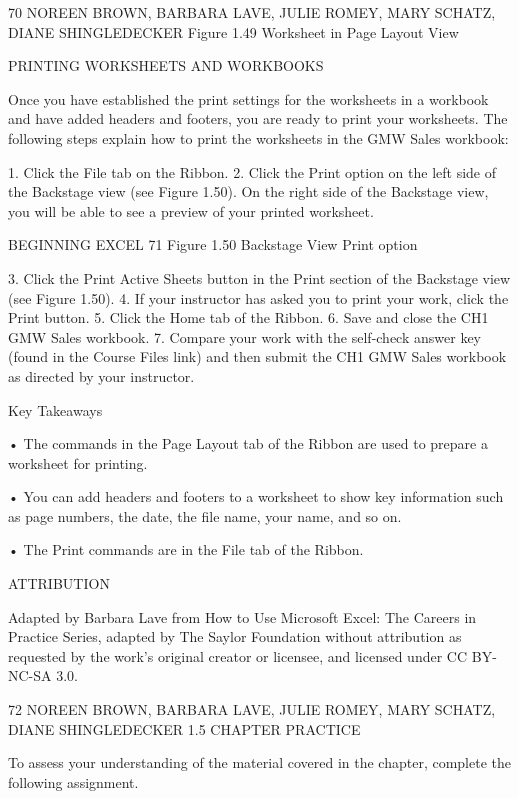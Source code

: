 70 NOREEN BROWN, BARBARA LAVE, JULIE ROMEY, MARY SCHATZ, DIANE SHINGLEDECKER
Figure 1.49 Worksheet in Page Layout View


PRINTING WORKSHEETS AND WORKBOOKS

Once you have established the print settings for the worksheets in a workbook and have added
headers and footers, you are ready to print your worksheets. The following steps explain how to print
the worksheets in the GMW Sales workbook:

1. Click the File tab on the Ribbon.
2. Click the Print option on the left side of the Backstage view (see Figure 1.50). On the right side
of the Backstage view, you will be able to see a preview of your printed worksheet.




BEGINNING EXCEL 71
Figure 1.50 Backstage View Print option


3.   Click the Print Active Sheets button in the Print section of the Backstage view (see Figure 1.50).
4.   If your instructor has asked you to print your work, click the Print button.
5.   Click the Home tab of the Ribbon.
6.   Save and close the CH1 GMW Sales workbook.
7.   Compare your work with the self-check answer key (found in the Course Files link) and then
submit the CH1 GMW Sales workbook as directed by your instructor.


Key Takeaways


• The commands in the Page Layout tab of the Ribbon are used to prepare a worksheet for printing.

• You can add headers and footers to a worksheet to show key information such as page numbers, the date,
the file name, your name, and so on.

• The Print commands are in the File tab of the Ribbon.



ATTRIBUTION

Adapted by Barbara Lave from How to Use Microsoft Excel: The Careers in Practice Series, adapted
by The Saylor Foundation without attribution as requested by the work’s original creator or
licensee, and licensed under CC BY-NC-SA 3.0.




72 NOREEN BROWN, BARBARA LAVE, JULIE ROMEY, MARY SCHATZ, DIANE SHINGLEDECKER
1.5 CHAPTER PRACTICE




To assess your understanding of the material covered in the chapter, complete the following
assignment.


